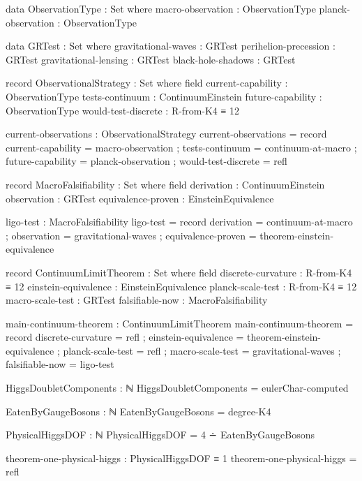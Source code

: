 \documentclass[11pt,a4paper]{book}
\begin{document}
\begin{code}
data ObservationType : Set where
  macro-observation : ObservationType
  planck-observation : ObservationType

data GRTest : Set where
  gravitational-waves : GRTest
  perihelion-precession : GRTest
  gravitational-lensing : GRTest
  black-hole-shadows : GRTest

record ObservationalStrategy : Set where
  field
    current-capability : ObservationType
    tests-continuum : ContinuumEinstein
    future-capability : ObservationType
    would-test-discrete : R-from-K4 ≡ 12

current-observations : ObservationalStrategy
current-observations = record
  { current-capability = macro-observation
  ; tests-continuum = continuum-at-macro
  ; future-capability = planck-observation
  ; would-test-discrete = refl
  }

record MacroFalsifiability : Set where
  field
    derivation : ContinuumEinstein
    observation : GRTest
    equivalence-proven : EinsteinEquivalence

ligo-test : MacroFalsifiability
ligo-test = record
  { derivation = continuum-at-macro
  ; observation = gravitational-waves
  ; equivalence-proven = theorem-einstein-equivalence
  }

\end{code}

\begin{code}
record ContinuumLimitTheorem : Set where
  field
    discrete-curvature : R-from-K4 ≡ 12
    einstein-equivalence : EinsteinEquivalence
    planck-scale-test : R-from-K4 ≡ 12
    macro-scale-test : GRTest
    falsifiable-now : MacroFalsifiability

main-continuum-theorem : ContinuumLimitTheorem
main-continuum-theorem = record
  { discrete-curvature = refl
  ; einstein-equivalence = theorem-einstein-equivalence
  ; planck-scale-test = refl
  ; macro-scale-test = gravitational-waves
  ; falsifiable-now = ligo-test
  }

\end{code}

\begin{code}
HiggsDoubletComponents : ℕ
HiggsDoubletComponents = eulerChar-computed
\end{code}

\begin{code}
EatenByGaugeBosons : ℕ
EatenByGaugeBosons = degree-K4

PhysicalHiggsDOF : ℕ
PhysicalHiggsDOF = 4 ∸ EatenByGaugeBosons

theorem-one-physical-higgs : PhysicalHiggsDOF ≡ 1
theorem-one-physical-higgs = refl
\end{code}
\end{document}
